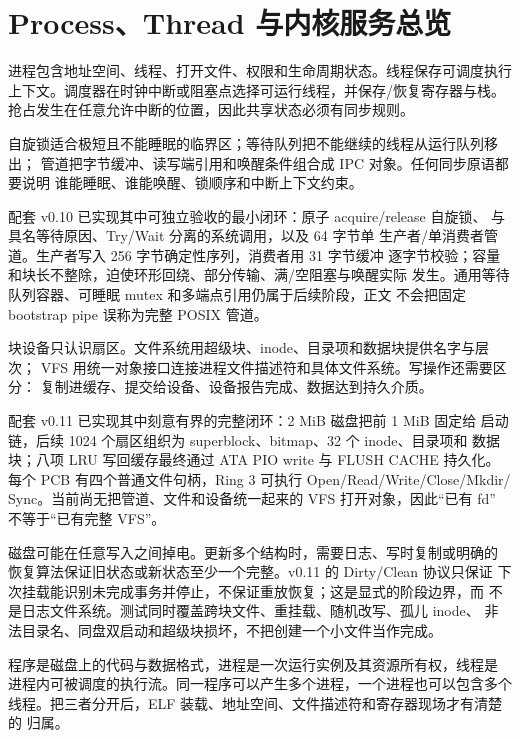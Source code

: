 \section{Process、Thread 与内核服务总览}

进程包含地址空间、线程、打开文件、权限和生命周期状态。线程保存可调度执行
上下文。调度器在时钟中断或阻塞点选择可运行线程，并保存/恢复寄存器与栈。
抢占发生在任意允许中断的位置，因此共享状态必须有同步规则。

自旋锁适合极短且不能睡眠的临界区；等待队列把不能继续的线程从运行队列移出；
管道把字节缓冲、读写端引用和唤醒条件组合成 IPC 对象。任何同步原语都要说明
谁能睡眠、谁能唤醒、锁顺序和中断上下文约束。

配套 v0.10 已实现其中可独立验收的最小闭环：原子 acquire/release 自旋锁、
 与具名等待原因、Try/Wait 分离的系统调用，以及 64 字节单
生产者/单消费者管道。生产者写入 256 字节确定性序列，消费者用 31 字节缓冲
逐字节校验；容量和块长不整除，迫使环形回绕、部分传输、满/空阻塞与唤醒实际
发生。通用等待队列容器、可睡眠 mutex 和多端点引用仍属于后续阶段，正文
不会把固定 bootstrap pipe 误称为完整 POSIX 管道。

块设备只认识扇区。文件系统用超级块、inode、目录项和数据块提供名字与层次；
VFS 用统一对象接口连接进程文件描述符和具体文件系统。写操作还需要区分：
复制进缓存、提交给设备、设备报告完成、数据达到持久介质。

配套 v0.11 已实现其中刻意有界的完整闭环：2 MiB 磁盘把前 1 MiB 固定给
启动链，后续 1024 个扇区组织为 superblock、bitmap、32 个 inode、目录项和
数据块；八项 LRU 写回缓存最终通过 ATA PIO write 与 FLUSH CACHE 持久化。
每个 PCB 有四个普通文件句柄，Ring 3 可执行 Open/Read/Write/Close/Mkdir/
Sync。当前尚无把管道、文件和设备统一起来的 VFS 打开对象，因此“已有 fd”
不等于“已有完整 VFS”。

磁盘可能在任意写入之间掉电。更新多个结构时，需要日志、写时复制或明确的
恢复算法保证旧状态或新状态至少一个完整。v0.11 的 Dirty/Clean 协议只保证
下次挂载能识别未完成事务并停止，不保证重放恢复；这是显式的阶段边界，而
不是日志文件系统。测试同时覆盖跨块文件、重挂载、随机改写、孤儿 inode、
非法目录名、同盘双启动和超级块损坏，不把创建一个小文件当作完成。

程序是磁盘上的代码与数据格式，进程是一次运行实例及其资源所有权，线程是
进程内可被调度的执行流。同一程序可以产生多个进程，一个进程也可以包含多个
线程。把三者分开后，ELF 装载、地址空间、文件描述符和寄存器现场才有清楚的
归属。

